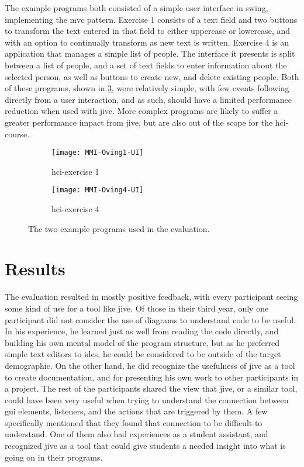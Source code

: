 The example programs both consisted of a simple user interface in swing, implementing the \gls{mvc} pattern.
Exercise 1 consists of a text field and two buttons to transform the text entered in that field to either uppercase or lowercase, and with an option to continually transform as new text is written.
Exercise 4 is an application that manages a simple list of people.
The interface it presents is split between a list of people, and a set of text fields to enter information about the selected person, as well as buttons to create new, and delete existing people.
Both of these programs, shown in \cref{fig:MMI-Oving-UI}, were relatively simple, with few events following directly from a user interaction, and as such, should have a limited performance reduction when used with \gls{jive}.
More complex programs are likely to suffer a greater performance impact from \gls{jive}, but are also out of the scope for the \gls{hci}-course.


\begin{figure}[H]
	\centering
	\begin{subfigure}{\textwidth}
		\centering
		\texttt{[image: MMI-Oving1-UI]}
		\caption{\gls{hci}-exercise 1}
		\label{fig:MMI-Oving1-UI}
	\end{subfigure}
	\begin{subfigure}{\textwidth}
		\centering
		\texttt{[image: MMI-Oving4-UI]}
		\caption{\gls{hci}-exercise 4}
		\label{fig:MMI-Oving4-UI}
	\end{subfigure}
	\caption{The two example programs used in the evaluation.}
	\label{fig:MMI-Oving-UI}
\end{figure}

\section{Results}\label{jiveEvalResults}

The evaluation resulted in mostly positive feedback, with every participant seeing some kind of use for a tool like \gls{jive}.
Of those in their third year, only one participant did not consider the use of diagrams to understand code to be useful.
In his experience, he learned just as well from reading the code directly, and building his own mental model of the program structure, but as he preferred simple text editors to \gls{ide}s, he could be considered to be outside of the target demographic.
On the other hand, he did recognize the usefulness of \gls{jive} as a tool to create documentation, and for presenting his own work to other participants in a project.
The rest of the participants shared the view that \gls{jive}, or a similar tool, could have been very useful when trying to understand the connection between \gls{gui} elements, listeners, and the actions that are triggered by them.
A few specifically mentioned that they found that connection to be difficult to understand.
One of them also had experiences as a student assistant, and recognized \gls{jive} as a tool that could give students a needed insight into what is going on in their programs.


